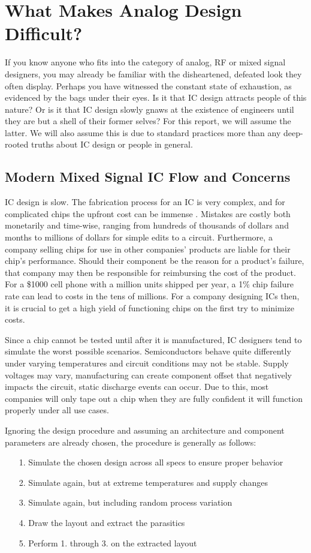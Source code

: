 \chapter{What Makes Analog Design Difficult?}

If you know anyone who fits into the category of analog, RF or mixed signal designers, you may already be familiar with the disheartened, defeated look they often display. Perhaps you have witnessed the constant state of exhaustion, as evidenced by the bags under their eyes. Is it that IC design attracts people of this nature? Or is it that IC design slowly gnaws at the existence of engineers until they are but a shell of their former selves? For this report, we will assume the latter. We will also assume this is due to standard practices more than any deep-rooted truths about IC design or people in general.

\section{Modern Mixed Signal IC Flow and Concerns}
IC design is slow. The fabrication process for an IC is very complex, and for complicated chips the upfront cost can be immense \cite{elder_real_nodate}. Mistakes are costly both monetarily and time-wise, ranging from hundreds of thousands of dollars and months to millions of dollars for simple edits to a circuit. Furthermore, a company selling chips for use in other companies' products are liable for their chip's performance. Should their component be the reason for a product's failure, that company may then be responsible for reimbursing the cost of the product. For a \$1000 cell phone with a million units shipped per year, a 1\% chip failure rate can lead to costs in the tens of millions. For a company designing ICs then, it is crucial to get a high yield of functioning chips on the first try to minimize costs.

Since a chip cannot be tested until after it is manufactured, IC designers tend to simulate the worst possible scenarios. Semiconductors behave quite differently under varying temperatures and circuit conditions may not be stable. Supply voltages may vary, manufacturing can create component offset that negatively impacts the circuit, static discharge events can occur. Due to this, most companies will only tape out a chip when they are fully confident it will function properly under all use cases. 

Ignoring the design procedure and assuming an architecture and component parameters are already chosen, the procedure is generally as follows:
\begin{itemize}
\item[1.] Simulate the chosen design across all specs to ensure proper behavior
\item[2.] Simulate again, but at extreme temperatures and supply changes
\item[3.] Simulate again, but including random process variation
\item[4.] Draw the layout and extract the parasitics
\item[5.] Perform 1. through 3. on the extracted layout
\end{itemize}

